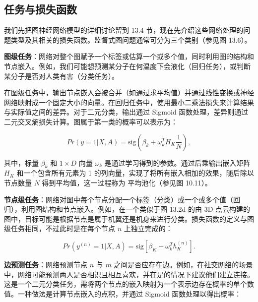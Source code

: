 \documentclass[lang=cn,newtx,10pt,scheme=chinese]{elegantbook}
\begin{document}
\subsection{任务与损失函数}
我们先把图神经网络模型的详细讨论留到 13.4 节，现在先介绍这些网络处理的问题类型及其相关的损失函数。监督式图问题通常可分为三个类别（参见图 13.6）。

\textbf{图级任务}：网络对整个图赋予一个标签或估算一个或多个值，同时利用图的结构和节点嵌入。例如，我们可能想预测某分子在何温度下会液化（回归任务），或判断某分子是否对人类有害（分类任务）。

在图级任务中，输出节点嵌入会被合并（如通过求平均值）并通过线性变换或神经网络映射成一个固定大小的向量。在回归任务中，使用最小二乘法损失来计算结果与实际值之间的差异。对于二元分类，输出通过 Sigmoid 函数处理，差异则通过二元交叉熵损失计算。图属于第一类的概率可以表示为：

\begin{equation}
Pr(y = 1|X, A) = \text{sig}(\beta_k + \omega_k^T H_K \frac{1}{N}), 
\end{equation}

其中，标量 \(\beta_k\) 和 \(1 \times D\) 向量 \(\omega_k\) 是通过学习得到的参数。通过后乘输出嵌入矩阵 \(H_K\) 和一个包含所有元素为 1 的列向量，实现了将所有嵌入相加的效果，随后除以节点数量 \(N\) 得到平均值，这一过程称为 平均池化（参见图 10.11）。

\textbf{节点级任务}：网络对图中每个节点分配一个标签（分类）或一个或多个值（回归），利用图结构和节点嵌入。例如，在一个类似于图 13.2d 的由 3D 点云构建的图中，目标可能是根据节点是属于机翼还是机身来进行分类。损失函数的定义与图级任务相同，不过此时是在每个节点 \(n\) 上独立完成的：

\begin{equation}
Pr(y^{(n)} = 1|X, A) = \text{sig}\left[\beta_K + \omega_k^T h_K^{(n)} \right]. 
\end{equation}

\textbf{边预测任务}：网络预测节点 \(n\) 与 \(m\) 之间是否应存在边。例如，在社交网络的场景中，网络可能预测两人是否相识且相互喜欢，并在是的情况下建议他们建立连接。这是一个二元分类任务，需将两个节点的嵌入映射为一个表示边存在概率的单个数值。一种做法是计算节点嵌入的点积，并通过 Sigmoid 函数处理以得出概率：
\end{document}
